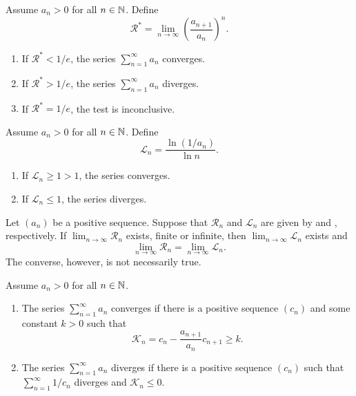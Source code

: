 \begin{proposition}
  Assume $a_n > 0$ for all $n \in \mathbb N$. Define
  \[ \mathcal{R}^\ast = \lim_{n \to \infty} \left(\frac{a_{n +
  1}}{a_n}\right)^n. \]
  \begin{enumerate}
    \item If $\mathcal{R}^\ast < 1/e$, the series $\sum_{n = 1}^{\infty}
      a_n$ converges.
    \item If $\mathcal{R}^\ast > 1/e$, the series $\sum_{n =
      1}^{\infty} a_n$ diverges.
    \item If $\mathcal{R}^\ast = 1/e$, the test is inconclusive.
  \end{enumerate}
\end{proposition}

\begin{proposition}
  Assume $a_n > 0$ for all $n \in \mathbb N$. Define
  \[ \mathcal{L}_n = \frac{\ln(1/a_n)}{\ln n}. \]
  \begin{enumerate}
    \item If $\mathcal{L}_n \geq 1 > 1$, the series converges.
    \item If $\mathcal{L}_n \leq 1$, the series diverges.
  \end{enumerate}
\end{proposition}

\begin{proposition}
  Let $(a_n)$ be a positive sequence. Suppose that $\mathcal{R}_n$
  and $\mathcal{L}_n$ are given by  and
  , respectively. If $\lim_{n \to \infty}
  \mathcal{R}_n$ exists, finite or infinite, then $\lim_{n \to
  \infty} \mathcal{L}_n$ exists and
  \[ \lim_{n \to \infty} \mathcal{R}_n = \lim_{n \to \infty} \mathcal{L}_n. \]
  The converse, however, is not necessarily true.
\end{proposition}

\begin{proposition}
  Assume $a_n > 0$ for all $n \in \mathbb N$.
  \begin{enumerate}
    \item The series $\sum_{n = 1}^{\infty} a_n$ converges if there
      is a positive sequence $(c_n)$ and some constant $k > 0$ such that
      \[ \mathcal{K}_n = c_n - \frac{a_{n + 1}}{a_n} c_{n + 1} \geq k. \]
    \item The series $\sum_{n = 1}^{\infty} a_n$ diverges if there is
      a positive sequence $(c_n)$ such that $\sum_{n = 1}^{\infty} 1/c_n$
      diverges and $\mathcal{K}_n \leq 0$.
  \end{enumerate}
\end{proposition}

